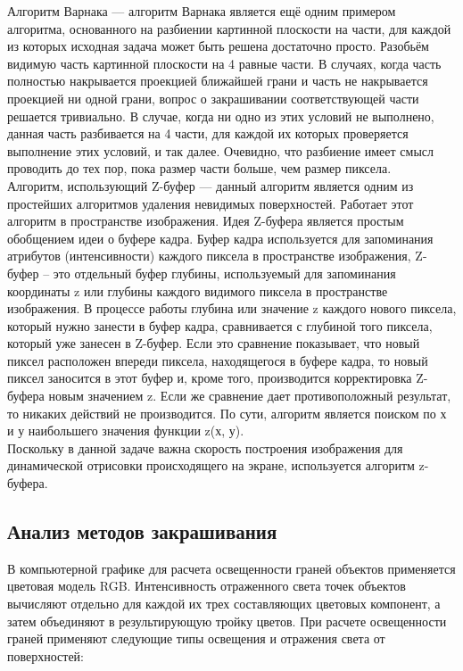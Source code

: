 Алгоритм Варнака — алгоритм Варнака является ещё одним примером алгоритма, основанного на разбиении картинной плоскости на части, для каждой из которых исходная задача может быть решена достаточно просто. Разобьём видимую часть картинной плоскости на 4 равные части. В случаях, когда часть полностью накрывается проекцией ближайшей грани и часть не накрывается проекцией ни одной грани, вопрос о закрашивании соответствующей части решается тривиально. В случае, когда ни одно из этих условий не выполнено, данная часть разбивается на 4 части, для каждой их которых проверяется выполнение этих условий, и так далее. Очевидно, что разбиение имеет смысл проводить до тех пор, пока размер части больше, чем размер пиксела. \cite{cgshish_2}\\

Алгоритм, использующий Z-буфер — данный алгоритм является одним из простейших алгоритмов удаления невидимых поверхностей. Работает этот алгоритм в пространстве изображения. Идея Z-буфера является простым обобщением идеи о буфере кадра. Буфер кадра используется для запоминания атрибутов (интенсивности) каждого пиксела в пространстве изображения, Z-буфер – это отдельный буфер глубины, используемый для запоминания координаты z или глубины каждого видимого пиксела в пространстве изображения. В процессе работы глубина или значение z каждого нового пиксела, который нужно занести в буфер кадра, сравнивается с глубиной того пиксела, который уже занесен в Z-буфер. Если это сравнение показывает, что новый пиксел расположен впереди пиксела, находящегося в буфере кадра, то новый пиксел заносится в этот буфер и, кроме того, производится корректировка Z-буфера новым значением z. Если же сравнение дает противоположный результат, то никаких действий не производится. По сути, алгоритм является поиском по х и у наибольшего значения функции z(х, у). \cite{cgshish}\\

Поскольку в данной задаче важна скорость построения изображения для динамической отрисовки происходящего на экране, используется алгоритм z-буфера.

\subsection{Анализ методов закрашивания}

В компьютерной графике для расчета освещенности граней объектов применяется цветовая модель RGB. Интенсивность отраженного света точек объектов вычисляют отдельно для каждой их трех составляющих цветовых компонент, а затем объединяют в результирующую тройку цветов. При расчете освещенности граней применяют следующие типы освещения и отражения света от поверхностей: 

